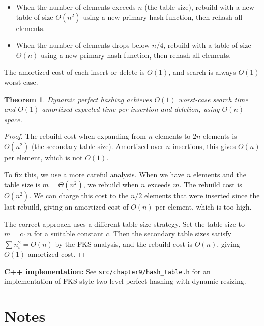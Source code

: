 \documentclass[twoside,12pt]{book}
\theoremstyle{plain}
\newtheorem{theorem}{Theorem}[chapter]
\theoremstyle{definition}
\theoremstyle{remark}
\newenvironment{cpplisting}{\begin{center}\small}{\end{center}}
\begin{document}
\begin{itemize}[nosep]
    \item When the number of elements exceeds $n$ (the table size), rebuild with a new table of size $\Theta(n^2)$ using a new primary hash function, then rehash all elements.
    \item When the number of elements drops below $n/4$, rebuild with a table of size $\Theta(n)$ using a new primary hash function, then rehash all elements.
\end{itemize}

The amortized cost of each insert or delete is $O(1)$, and search is always $O(1)$ worst-case.

\begin{theorem}\label{thm:dynamic-perfect}
Dynamic perfect hashing achieves $O(1)$ worst-case search time and $O(1)$ amortized expected time per insertion and deletion, using $O(n)$ space.
\end{theorem}

\begin{proof}
The rebuild cost when expanding from $n$ elements to $2n$ elements is $O(n^2)$ (the secondary table size). Amortized over $n$ insertions, this gives $O(n)$ per element, which is not $O(1)$.

To fix this, we use a more careful analysis. When we have $n$ elements and the table size is $m = \Theta(n^2)$, we rebuild when $n$ exceeds $m$. The rebuild cost is $O(n^2)$. We can charge this cost to the $n/2$ elements that were inserted since the last rebuild, giving an amortized cost of $O(n)$ per element, which is too high.

The correct approach uses a different table size strategy. Set the table size to $m = c \cdot n$ for a suitable constant $c$. Then the secondary table sizes satisfy $\sum n_i^2 = O(n)$ by the FKS analysis, and the rebuild cost is $O(n)$, giving $O(1)$ amortized cost.
\end{proof}

\begin{cpplisting}
\textbf{C++ implementation:} See \texttt{src/chapter9/hash\_table.h} for an implementation
of FKS-style two-level perfect hashing with dynamic resizing.
\end{cpplisting}

\section*{Notes}
\end{document}
